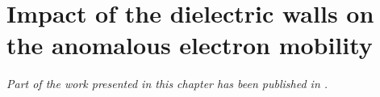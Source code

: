 
\clearpage
\ifodd\value{page}\else
  \thispagestyle{empty}
\fi


\chapter[Study of dielectric impact on mobility]{Impact of the dielectric walls on the anomalous electron mobility }
\label{ch-2}

\begin{Chabstract}

\emph{
Part of the work presented in this chapter has been published in \citet{tavant2018}.}
\end{Chabstract}
\vspace{1ex}

\begin{Chabstract}
\lipsum[1-2]
\end{Chabstract}


\minitoc





